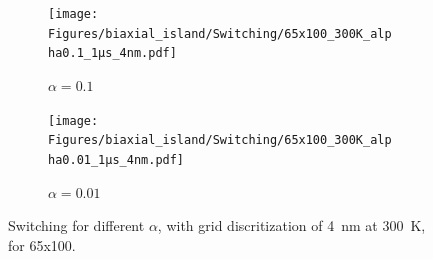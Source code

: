\documentclass[10pt,a4paper]{article}
\begin{document}
\begin{figure}
     \centering
     \begin{subfigure}[b]{0.75\textwidth}
         \centering
         \texttt{[image: Figures/biaxial\_island/Switching/65x100\_300K\_alpha0.1\_1µs\_4nm.pdf]}
         \caption{$\alpha=0.1$}
         \label{fig:switching-alpha-0.1}
     \end{subfigure}
     \hfill
     \begin{subfigure}[b]{0.75\textwidth}
         \centering
         \texttt{[image: Figures/biaxial\_island/Switching/65x100\_300K\_alpha0.01\_1µs\_4nm.pdf]}
         \caption{$\alpha = 0.01$}
         \label{fig:switching-alpha-0.01}
     \end{subfigure}
        \caption{Switching for different $\alpha$, with grid discritization of \SI{4}{\nano\metre} at \SI{300}{\kelvin}, for 65x100.}
        \label{fig:switching-alpha}
\end{figure}
\end{document}
